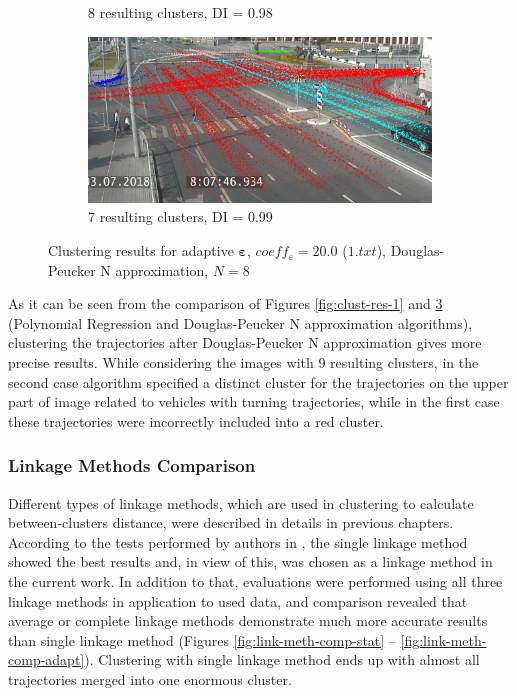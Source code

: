 \begin{figure}[!htb]
\begin{subfigure}[!htb]{0.23\textwidth}
		\caption{8 resulting clusters, DI = 0.98}
		\label{fig:8cl-rdp-n-1}
	\end{subfigure}
	\hfill
	\begin{subfigure}[!htb]{0.23\textwidth}
		\centering{}
		\includegraphics[width=\textwidth]{images/7cl-rdp-n-1.png}
		\caption{7 resulting clusters, DI = 0.99}
		\label{fig:7cl-rdp-n-1}
	\end{subfigure}
	\caption{Clustering results for adaptive $\bm{\varepsilon}$, $coeff_\varepsilon = 20.0$ ($1.txt$), Douglas-Peucker N approximation, $N = 8$}
	\label{fig:clust-res-1-rdp-n}
\end{figure}

As it can be seen from the comparison of Figures \ref{fig:clust-res-1} and \ref{fig:clust-res-1-rdp-n} (Polynomial Regression and Douglas-Peucker N approximation algorithms), clustering the trajectories after Douglas-Peucker N approximation gives more precise results. While considering the images with 9 resulting clusters, in the second case algorithm specified a distinct cluster for the trajectories on the upper part of image related to vehicles with turning trajectories, while in the first case these trajectories were incorrectly included into a red cluster.

\subsubsection{Linkage Methods Comparison}

Different types of linkage methods, which are used in clustering to calculate between-clusters distance, were described in details in previous chapters. According to the tests performed by authors in \cite{inproceedings:7_related_work}, the single linkage method showed the best results and, in view of this, was chosen as a linkage method in the current work. In addition to that, evaluations were performed using all three linkage methods in application to used data, and comparison  revealed that average or complete linkage methods demonstrate much more accurate results than single linkage method (Figures \ref{fig:link-meth-comp-stat} -- \ref{fig:link-meth-comp-adapt}). Clustering with single linkage method ends up with almost all trajectories merged into one enormous cluster.

